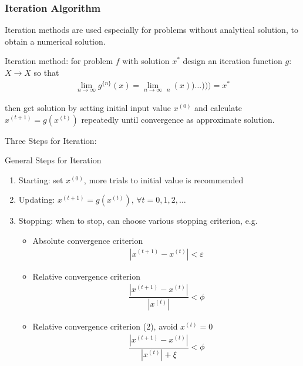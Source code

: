 

    
\subsubsection{Iteration Algorithm}
    Iteration methods are used especially for problems without analytical solution, to obtain a numerical solution.

    Iteration method: for problem $ f $ with solution $ x^* $ design an iteration function $ g $: $ X\to X $ so that 
    \begin{align}
        \lim_{n\to\infty}g^{\{n\}}(x)=\lim_{n\to\infty}\mathop{\underbrace{g(g(g(\ldots g(g}}\limits_{n}(x))\ldots ))) =x^*
    \end{align}
    
    then get solution by setting initial input value $ x^{(0)} $ and calculate $ x^{(t+1)}=g(x^{(t)}) $ repeatedly until convergence as approximate solution.
    
\begin{point}
    Three Steps for Iteration:
\end{point}

\begin{algorithm}{General Steps for Iteration}
    \begin{enumerate}[topsep=2pt,itemsep=2pt]
        \item Starting: set $ x^{(0)} $, more trials to initial value is recommended
        \item Updating: $ x^{(t+1)}=g(x^{(t)}) ,\,\forall t=0,1,2,\ldots$
        \item Stopping: when to stop, can choose various stopping criterion, e.g.
        \begin{itemize}[topsep=2pt,itemsep=0pt]
            \item Absolute convergence criterion
            \begin{align}
                |x^{(t+1)}-x^{(t)}|<\varepsilon  
            \end{align}
            
            \item Relative convergence criterion
            \begin{align}
                \dfrac{|x^{(t+1)}-x^{(t)}|}{|x^{(t)}|}< \phi 
            \end{align}
            
            \item Relative convergence criterion (2), avoid $ x^{(t)}=0 $
            \begin{align}
                \dfrac{|x^{(t+1)}-x^{(t)}|}{|x^{(t)}|+\xi }< \phi 
            \end{align}        
        \end{itemize}
    \end{enumerate}
\end{algorithm}
    



